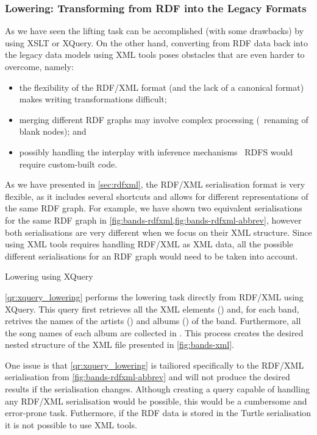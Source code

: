 \subsubsection*{Lowering: Transforming from RDF into the Legacy Formats}
\label{sec:lowering}

As we have seen the lifting task can be accomplished (with some drawbacks) by using \ac{XSLT} or XQuery.
%
On the other hand, converting from \ac{RDF} data back into the legacy data models using \ac{XML} tools poses obstacles
that are even harder to overcome, namely:
%
\begin{itemize}[noitemsep]
\item the flexibility of the RDF/XML format (and the lack of a canonical format) makes writing transformations
  difficult;
\item merging different \ac{RDF} graphs may involve complex processing (\eg~renaming of blank nodes); and
\item possibly handling the interplay with inference mechanisms \eg~\ac{RDFS} would require custom-built code.
\end{itemize}


As we have presented in \cref{sec:rdfxml}, the RDF/XML serialisation format is very flexible, as it includes several
shortcuts and allows for different representations of the same \ac{RDF} graph.  For example, we have shown two
equivalent serialisations for the same \ac{RDF} graph in \cref{fig:bands-rdfxml,fig:bands-rdfxml-abbrev}, however both
serialisations are very different when we focus on their \ac{XML} structure.
%
Since using \ac{XML} tools requires handling RDF/XML as \ac{XML} data, all the possible different serialisations for an
\ac{RDF} graph would need to be taken into account.


\begin{query}[t]
  
  \caption{Lowering using XQuery}
  \label{qr:xquery_lowering}
\end{query}
%
\begin{example}
  \cref{qr:xquery_lowering} performs the lowering task directly from RDF/XML using XQuery. This query first
  retrieves all the  \ac{XML} elements () and, for each
  band, retrives the names of the artists () and albums
  () of the band.
  Furthermore, all the song names of each album are collected in .
  This process creates the desired nested structure of the \ac{XML} file presented in \cref{fig:bands-xml}.
\end{example}
% 
One issue is that \cref{qr:xquery_lowering} is tailiored specifically to the RDF/XML serialisation from
\cref{fig:bands-rdfxml-abbrev} and will not produce the desired results if the serialisation changes.
%
Although creating a query capable of handling any RDF/XML serialisation would be possible, this would be a cumbersome
and error-prone task.  Futhermore, if the \ac{RDF} data is stored in the Turtle serialisation it is not possible to use
\ac{XML} tools.

